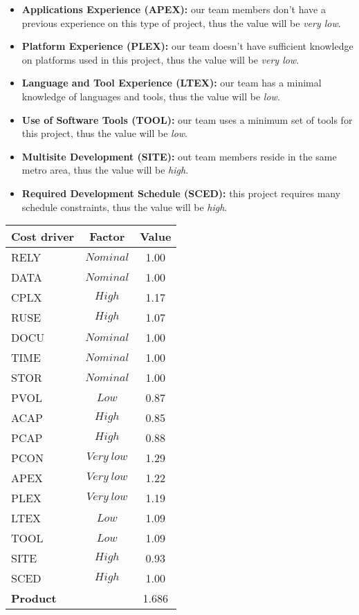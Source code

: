\begin{itemize}
	\item\textbf{Applications Experience (APEX):} our team members don't have a previous experience on this type of project, thus the value will be \textit{very low}.
	
	\item\textbf{Platform Experience (PLEX):} our team  doesn't have sufficient knowledge on platforms used in this project, thus the value will be \textit{very low}.
	
	\item\textbf{Language and Tool Experience (LTEX):} our team has a minimal knowledge of languages and tools, thus the value will be \textit{low}.
	
	\item\textbf{Use of Software Tools (TOOL):} our team uses a minimum set of tools for this project, thus the value will be \textit{low}.
	
	\item\textbf{Multisite Development (SITE):} out team members reside in the same metro area, thus the value will be \textit{high}.
	
	\item\textbf{Required Development Schedule (SCED):} this project requires many schedule constraints, thus the value will be \textit{high}.
	
\end{itemize}

\vspace{10mm}

\begin{center}
	\begin{tabular}{| l | c | c |}
		\hline
		\textbf{Cost driver} & \textbf{Factor} & \textbf{Value} \\ \hline
		RELY & $Nominal$ & 1.00\\ \hline
		DATA & $Nominal$ & 1.00\\ \hline
		CPLX & $High$ & 1.17\\ \hline
		RUSE & $High$ & 1.07\\ \hline
		DOCU & $Nominal$ & 1.00\\ \hline
		TIME & $Nominal$ & 1.00\\ \hline
		STOR & $Nominal$ & 1.00\\ \hline
		PVOL & $Low$ & 0.87\\ \hline
		ACAP & $High$ & 0.85\\ \hline
		PCAP & $High$ & 0.88\\ \hline
		PCON & $Very\ low$ & 1.29\\ \hline
		APEX & $Very\ low$ & 1.22\\ \hline
		PLEX & $Very\ low$ & 1.19\\ \hline
		LTEX & $Low$ & 1.09\\ \hline
		TOOL & $Low$ & 1.09\\ \hline
		SITE & $High$ & 0.93\\ \hline
		SCED & $High$ & 1.00\\ \hline
		\multicolumn{2}{|l|}{\textbf{Product}} & 1.686\\ \hline
	\end{tabular}
\end{center}